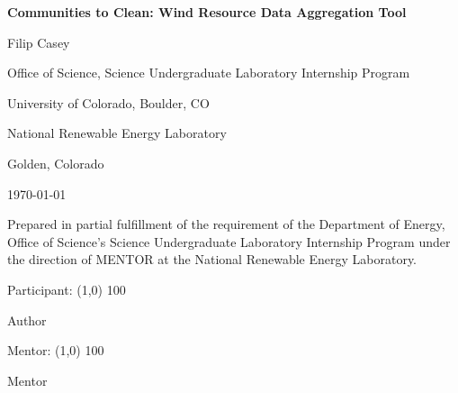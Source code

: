 \documentclass[12pt, oneside]{article}   	%
\begin{document}
\begin{titlepage}
	\centering

	\textbf{Communities to Clean: Wind Resource Data Aggregation Tool}\par
	\vspace{14pt}
	Filip Casey\par
	\vspace{42pt}
	Office of Science, Science Undergraduate Laboratory Internship Program\par
	\vspace{14pt}
	University of Colorado, Boulder, CO\par
	\vspace{42pt}
	National Renewable Energy Laboratory\par
	\vspace{14pt}
	Golden, Colorado\par
	\vspace{56pt}
	\today\par
	\vspace{70pt}
	Prepared in partial fulfillment of the requirement of the Department of
	Energy, Office of Science's Science Undergraduate Laboratory Internship
	Program under the direction of MENTOR at the National Renewable Energy
	Laboratory.\par
	\vspace{56pt}
	Participant: \line(1,0) {100}\par
	\hspace{63pt} Author\par
	\vspace{28pt}
	Mentor: \line(1,0) {100}\par
	\hspace{40pt} Mentor\par
	\vfill
	\thispagestyle{plain}
\end{titlepage}

\setcounter{page}{2}
\end{document}
